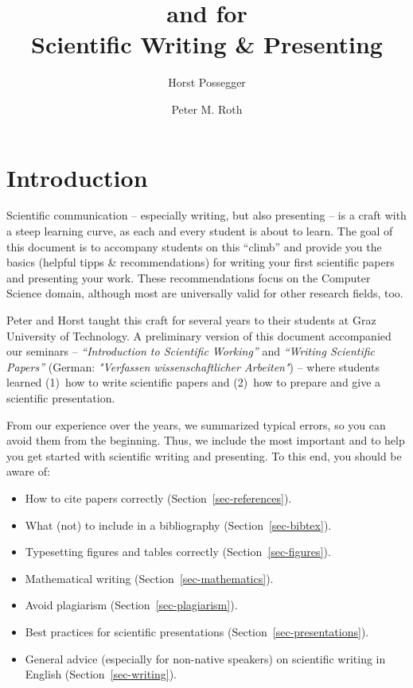 \documentclass[11pt,a4paper]{article}
\author{
Horst Possegger
\and
Peter M. Roth
}
\title{\goodstyle{Dos} and \badstyle{Don'ts} for\\[0.5em]Scientific Writing \& Presenting}
\begin{document}
\tableofcontents
\pagebreak

\section{Introduction}
\label{sec-intro}
Scientific communication -- especially writing, but also presenting -- is a craft with a steep learning curve, as each and every student is about to learn.
The goal of this document is to accompany students on this ``climb'' and provide you the basics (helpful tipps \& recommendations) for writing your first scientific papers and presenting your work.
These recommendations focus on the Computer Science domain, although most are universally valid for other research fields, too.

Peter and Horst taught this craft for several years to their students at Graz University of Technology.
A preliminary version of this document accompanied our seminars -- \emph{``Introduction to Scientific Working''} and \emph{``Writing Scientific Papers''} (German: \emph{"Verfassen wissenschaftlicher Arbeiten"}) -- where students learned (1)~how to write scientific papers and (2)~how to prepare and give a scientific presentation. 

From our experience over the years, we summarized typical errors, so you can avoid them from the beginning.
Thus, we include the most important  and  to help you get started with scientific writing and presenting.
To this end, you should be aware of:
\begin{itemize}
\item How to cite papers correctly (Section~\ref{sec-references}).
\item What (not) to include in a bibliography (Section~\ref{sec-bibtex}).
\item Typesetting figures and tables correctly (Section~\ref{sec-figures}).
\item Mathematical writing (Section~\ref{sec-mathematics}).
\item Avoid plagiarism (Section~\ref{sec-plagiarism}).
\item Best practices for scientific presentations (Section~\ref{sec-presentations}).
\item General advice (especially for non-native speakers) on scientific writing in English (Section~\ref{sec-writing}).
\end{itemize}
\end{document}
